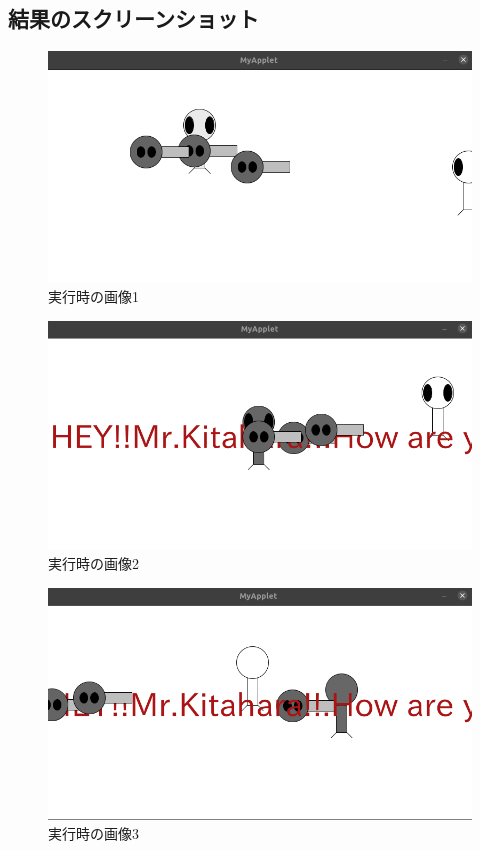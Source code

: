 \documentclass[dvipdfmx]{jsarticle}
\begin{document}
\subsection{結果のスクリーンショット}
\begin{figure}[H]
  \centering
  \includegraphics[scale=0.4]{images/result1.png}
  \caption{実行時の画像1}
\end{figure}
\begin{figure}[H]
  \centering
  \includegraphics[scale=0.4]{images/result2.png}
  \caption{実行時の画像2}
\end{figure}
\begin{figure}[H]
  \centering
  \includegraphics[scale=0.4]{images/result3.png}
  \caption{実行時の画像3}
\end{figure}
\end{document}
